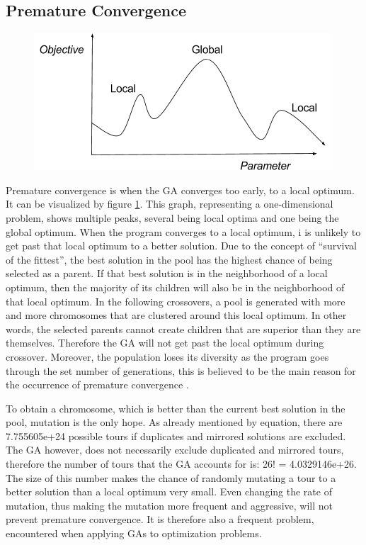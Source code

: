 \subsection{Premature Convergence}

\par

\begin{figure}
			\includegraphics[trim = {0 0 5mm 0}, clip, scale = 0.5]{PrematureConvergence}
	\label{PrematureConvergence}
\end{figure}

Premature convergence is when the GA converges too early, to a local optimum.
It can be visualized by figure \ref{PrematureConvergence}. This graph, representing a one-dimensional problem, shows multiple peaks, several being local optima and one being the global optimum. When the program converges to a local optimum, i is unlikely to get past that local optimum to a better solution. Due to the concept of “survival of the fittest”, the best solution in the pool has the highest chance of being selected as a parent. If that best solution is in the neighborhood of a local optimum, then the majority of its children will also be in the neighborhood of that local optimum. In the following crossovers, a pool is generated with more and more chromosomes that are clustered around this local optimum. In other words, the selected parents cannot create children that are superior than they are themselves. Therefore the GA will not get past the local optimum during crossover. Moreover, the population loses its diversity as the program goes through the set number of generations, this is believed to be the main reason for the occurrence of premature convergence \cite{Premconvergence}\cite{Popdiv}\cite{Congress}.

\par
To obtain a chromosome, which is better than the current best solution in the pool, mutation is the only hope. As already mentioned by equation, there are 7.755605e+24 possible tours if duplicates and mirrored solutions are excluded. The GA however, does not necessarily exclude duplicated and mirrored tours, therefore the number of tours that the GA accounts for is: 26! = 4.0329146e+26. The size of this number makes the chance of randomly mutating a tour to a better solution than a local optimum very small. Even changing the rate of mutation, thus making the mutation more frequent and aggressive, will not prevent premature convergence. It is therefore also a frequent problem, encountered when applying GAs to optimization problems. 

